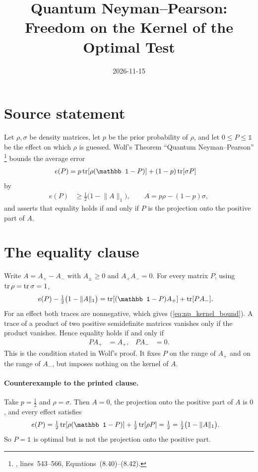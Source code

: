 \documentclass{article}
\title{Quantum Neyman--Pearson: Freedom on the Kernel of the Optimal Test}
\author{}
\date{2026-11-15}
\begin{document}
\maketitle
{}

\section{Source statement}
Let $\rho,\sigma$ be density matrices, let $p$ be the prior probability of
$\rho$, and let $0\le P\le\mathbb 1$ be the effect on which $\rho$ is guessed.
Wolf's Theorem ``Quantum Neyman--Pearson'' \cite{Wolf2012Quantum}%
\footnote{,
lines~543--566, Equations~(8.40)--(8.42).}
bounds the average error
\begin{align}
    e(P) &= p\tr[\rho(\mathbb 1-P)]+(1-p)\tr[\sigma P]
    \label{eq:np_kernel_error}
\end{align}
by
\begin{align}
    e(P) &\ge \tfrac12\bigl(1-\lVert A\rVert_1\bigr),
    \qquad A=p\rho-(1-p)\sigma,
    \label{eq:np_kernel_bound}
\end{align}
and asserts that equality holds if and only if $P$ is the projection onto
the positive part of $A$.

\section{The equality clause}
Write $A=A_+-A_-$ with $A_\pm\ge0$ and $A_+A_-=0$. For every matrix $P$,
using $\operatorname{tr}\rho=\operatorname{tr}\sigma=1$,
\begin{align}
    e(P)-\tfrac12\bigl(1-\lVert A\rVert_1\bigr)
        &= \tr[(\mathbb 1-P)A_+]+\tr[PA_-].
    \label{eq:np_kernel_excess}
\end{align}
For an effect both traces are nonnegative, which gives
(\ref{eq:np_kernel_bound}). A trace of a product of two positive
semidefinite matrices vanishes only if the product vanishes. Hence equality
holds if and only if
\begin{align}
    PA_+ &= A_+, & PA_- &= 0.
    \label{eq:np_kernel_condition}
\end{align}
This is the condition stated in Wolf's proof. It fixes $P$ on the range of
$A_+$ and on the range of $A_-$, but imposes nothing on the kernel of $A$.

\paragraph{Counterexample to the printed clause.}
Take $p=\tfrac12$ and $\rho=\sigma$. Then $A=0$, the projection onto the
positive part of $A$ is $0$, and every effect satisfies
\begin{align}
    e(P) &= \tfrac12\tr[\rho(\mathbb 1-P)]+\tfrac12\tr[\rho P]
          = \tfrac12
          = \tfrac12\bigl(1-\lVert A\rVert_1\bigr).
    \label{eq:np_kernel_counterexample}
\end{align}
So $P=\mathbb 1$ is optimal but is not the projection onto the positive part.
\end{document}
